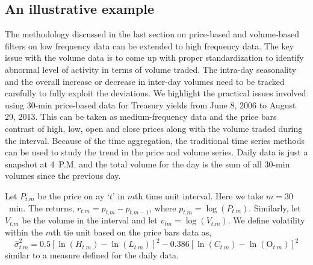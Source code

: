 \subsection{An illustrative example}


The methodology discussed in the last section on price-based and volume-based filters on low frequency data can be extended to high frequency data. The key issue with the volume data is to come up with proper standardization to identify abnormal level of activity in terms of volume traded. The intra-day seasonality and the overall increase or decrease in inter-day volumes need to be tracked carefully to fully exploit the deviations. We highlight the practical issues involved using 30-min price-based data for Treasury yields from June 8, 2006 to August 29, 2013. This can be taken as medium-frequency data and the price bars contrast of high, low, open and close prices along with the volume traded during the interval. Because of the time aggregation, the traditional time series methods can be used to study the trend in the price and volume series. Daily data is just a snapshot at 4~P.M. and the total volume for the day is the sum of all 30-min volumes since the previous day.


Let $P_{t. m}$ be the price on ay `$t$' in $m$th time unit interval. Here we take $m=30$~min. The returns, $r_{t. m}= p_{t. m} - p_{t . m-1}$, where $p_{t. m}=\log(P_{t.m})$. Similarly, let $V_{t.m}$ be the volume in the interval and let $v_{tm}=\log(V_{t. m})$. We define volatility within the $m$th tie unit based on the price bars data as,
	\begin{equation}\label{eqn:hatsigmasq}
	\hat{\sigma}_{t. m}^2= 0.5 [ \ln(H_{t. m}) - \ln(L_{t.m})]^2 - 0.386[\ln(C_{t.m}) - \ln(\text{O}_{t . m})]^2
	\end{equation}
similar to a measure defined for the daily data. 

